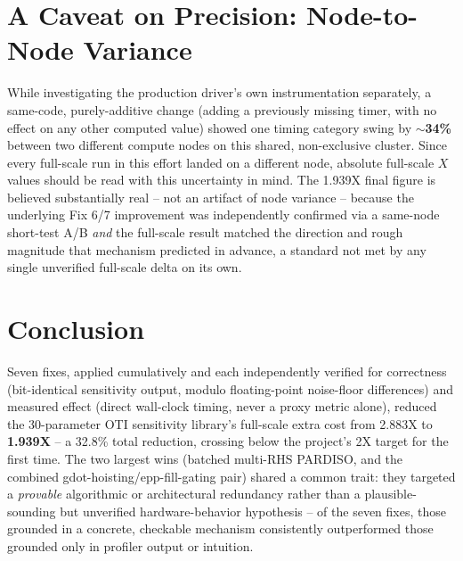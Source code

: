 \documentclass[11pt]{article}
\begin{document}
\section{A Caveat on Precision: Node-to-Node Variance}\label{sec:lessons}

While investigating the production driver's own instrumentation
separately, a same-code, purely-additive change (adding a previously
missing timer, with no effect on any other computed value) showed one
timing category swing by \textbf{$\sim$34\%} between two different compute
nodes on this shared, non-exclusive cluster. Since every full-scale run in
this effort landed on a different node, absolute full-scale $X$ values
should be read with this uncertainty in mind. The 1.939X final figure is
believed substantially real -- not an artifact of node variance -- because
the underlying Fix 6/7 improvement was independently confirmed via a
same-node short-test A/B \emph{and} the full-scale result matched the
direction and rough magnitude that mechanism predicted in advance, a
standard not met by any single unverified full-scale delta on its own.

\section{Conclusion}

Seven fixes, applied cumulatively and each independently verified for
correctness (bit-identical sensitivity output, modulo floating-point
noise-floor differences) and measured effect (direct wall-clock timing,
never a proxy metric alone), reduced the 30-parameter OTI sensitivity
library's full-scale extra cost from 2.883X to \textbf{1.939X} -- a
32.8\% total reduction, crossing below the project's 2X target for the
first time. The two largest wins (batched multi-RHS PARDISO, and the
combined gdot-hoisting/epp-fill-gating pair) shared a common trait: they
targeted a \emph{provable} algorithmic or architectural redundancy rather
than a plausible-sounding but unverified hardware-behavior hypothesis --
of the seven fixes, those grounded in a concrete, checkable mechanism
consistently outperformed those grounded only in profiler output or
intuition.
\end{document}
